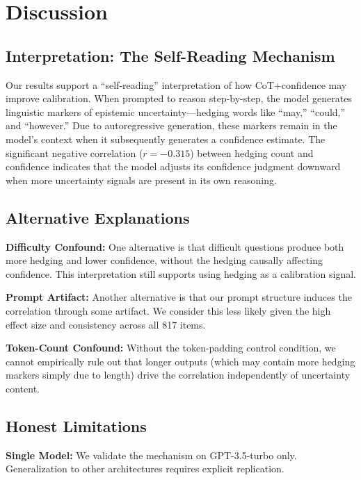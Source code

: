 \section{Discussion}

\subsection{Interpretation: The Self-Reading Mechanism}

Our results support a ``self-reading'' interpretation of how CoT+confidence may improve calibration. When prompted to reason step-by-step, the model generates linguistic markers of epistemic uncertainty---hedging words like ``may,'' ``could,'' and ``however.'' Due to autoregressive generation, these markers remain in the model's context when it subsequently generates a confidence estimate. The significant negative correlation ($r=-0.315$) between hedging count and confidence indicates that the model adjusts its confidence judgment downward when more uncertainty signals are present in its own reasoning.

\subsection{Alternative Explanations}

\textbf{Difficulty Confound:} One alternative is that difficult questions produce both more hedging and lower confidence, without the hedging causally affecting confidence. This interpretation still supports using hedging as a calibration signal.

\textbf{Prompt Artifact:} Another alternative is that our prompt structure induces the correlation through some artifact. We consider this less likely given the high effect size and consistency across all 817 items.

\textbf{Token-Count Confound:} Without the token-padding control condition, we cannot empirically rule out that longer outputs (which may contain more hedging markers simply due to length) drive the correlation independently of uncertainty content.

\subsection{Honest Limitations}

\textbf{Single Model:} We validate the mechanism on GPT-3.5-turbo only. Generalization to other architectures requires explicit replication.

